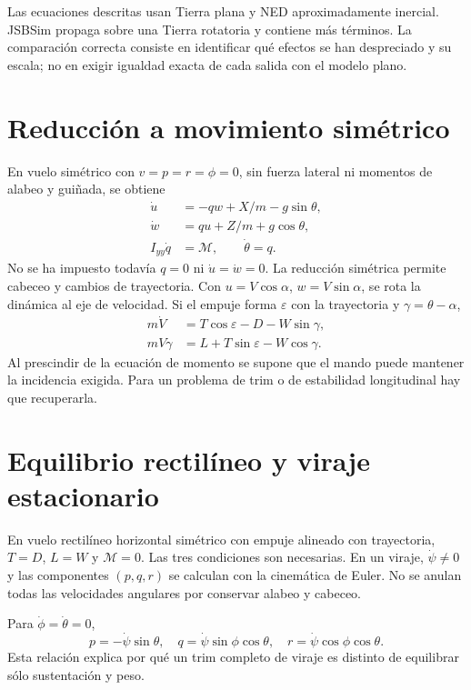 Las ecuaciones descritas usan Tierra plana y NED aproximadamente inercial. JSBSim propaga sobre una Tierra rotatoria y contiene más términos. La comparación correcta consiste en identificar qué efectos se han despreciado y su escala; no en exigir igualdad exacta de cada salida con el modelo plano.

\section{Reducción a movimiento simétrico}
En vuelo simétrico con $v=p=r=\phi=0$, sin fuerza lateral ni momentos de alabeo y guiñada, se obtiene
\begin{align}
\dot u&=-qw+X/m-g\sin\theta,\\
\dot w&=qu+Z/m+g\cos\theta,\\
I_{yy}\dot q&=\mathcal M,\qquad \dot\theta=q.
\end{align}
No se ha impuesto todavía $q=0$ ni $\dot u=\dot w=0$. La reducción simétrica permite cabeceo y cambios de trayectoria. Con $u=V\cos\alpha$, $w=V\sin\alpha$, se rota la dinámica al eje de velocidad. Si el empuje forma $\varepsilon$ con la trayectoria y $\gamma=\theta-\alpha$,
\begin{align}
m\dot V&=T\cos\varepsilon-D-W\sin\gamma,\\
mV\dot\gamma&=L+T\sin\varepsilon-W\cos\gamma.
\label{eq:simetrico-trayectoria}
\end{align}
Al prescindir de la ecuación de momento se supone que el mando puede mantener la incidencia exigida. Para un problema de trim o de estabilidad longitudinal hay que recuperarla.

\section{Equilibrio rectilíneo y viraje estacionario}
En vuelo rectilíneo horizontal simétrico con empuje alineado con trayectoria, $T=D$, $L=W$ y $\mathcal M=0$. Las tres condiciones son necesarias. En un viraje, $\dot\psi\neq0$ y las componentes $(p,q,r)$ se calculan con la cinemática de Euler. No se anulan todas las velocidades angulares por conservar alabeo y cabeceo.

Para $\dot\phi=\dot\theta=0$,
\begin{equation}
p=-\dot\psi\sin\theta,\quad
q=\dot\psi\sin\phi\cos\theta,\quad
r=\dot\psi\cos\phi\cos\theta.
\end{equation}
Esta relación explica por qué un trim completo de viraje es distinto de equilibrar sólo sustentación y peso.


